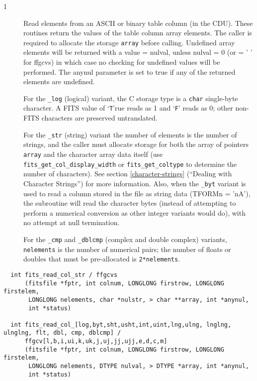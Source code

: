 \documentclass[11pt]{book}
\begin{document}
\begin{description}
\item[1 ] Read elements from an ASCII or binary table column (in the CDU).  These
    routines return the values of the table column array elements.  The caller
    is required to allocate the storage \verb+array+ before calling.  Undefined
    array elements will be returned with a value = nulval, unless nulval = 0
    (or = ' ' for ffgcvs) in which case no checking for undefined values will
    be performed. The anynul parameter is set to true if any of the returned
    elements are undefined. 

    For the \verb+_log+ (logical) variant, the C storage type is a
    \verb+char+ single-byte character.  A FITS value of `\verb+T+'rue
    reads as 1 and `\verb+F+' reads as 0; other non-FITS characters 
    are preserved untranslated.

    For the \verb+_str+ (string) variant the number
    of elements is the number of strings, and the caller must allocate storage
    for both the array of pointers \verb+array+ and the character array data
    itself (use \verb+fits_get_col_display_width+ or \verb+fits_get_coltype+ to 
    determine the number of characters).  See section \ref{character-strings}
    (``Dealing with Character Strings'') for more information.  Also, when
    the \verb+_byt+ variant is used to read a column stored in the file as 
    string data (TFORMn = 'nA'), the subroutine will read the character
    bytes (instead of attempting to perform a numerical conversion as other
    integer variants would do), with no attempt at null termination.

    For the \verb+_cmp+ and \verb+_dblcmp+
    (complex and double complex) variants, \verb+nelements+ is the number
    of numerical pairs; the number of floats or doubles that must be 
    pre-allocated is \verb+2*nelements+.
\label{ffgcvx}
\end{description}

\begin{verbatim}
  int fits_read_col_str / ffgcvs
      (fitsfile *fptr, int colnum, LONGLONG firstrow, LONGLONG firstelem,
       LONGLONG nelements, char *nulstr, > char **array, int *anynul,
       int *status)

  int fits_read_col_[log,byt,sht,usht,int,uint,lng,ulng, lnglng, ulnglng, flt, dbl, cmp, dblcmp] /
      ffgcv[l,b,i,ui,k,uk,j,uj,jj,ujj,e,d,c,m]
      (fitsfile *fptr, int colnum, LONGLONG firstrow, LONGLONG firstelem,
       LONGLONG nelements, DTYPE nulval, > DTYPE *array, int *anynul,
       int *status)
\end{verbatim}
\end{document}
